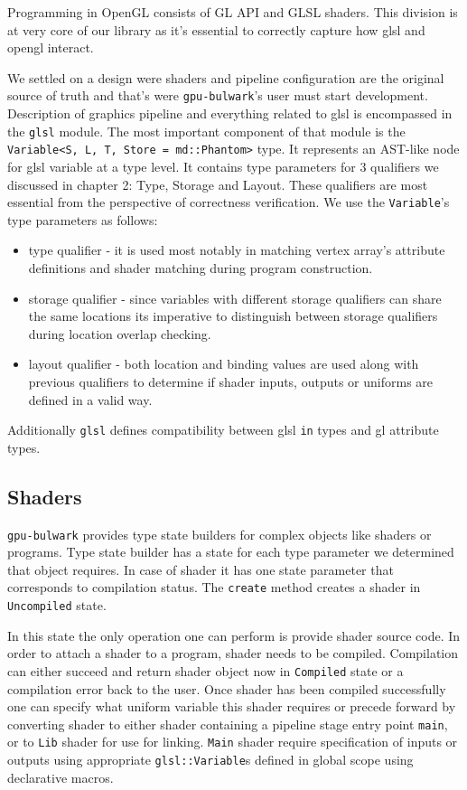 Programming in OpenGL consists of GL API and GLSL shaders. This division is at very core of our library as it's essential to correctly capture how glsl and opengl interact.

We settled on a design were shaders and pipeline configuration are the original source of truth and that's were \texttt{gpu-bulwark}'s user must start development.
Description of graphics pipeline and everything related to glsl is encompassed in the \texttt{glsl} module.
The most important component of that module is the \texttt{Variable<S, L, T, Store = md::Phantom>} type.
It represents an AST-like node for glsl variable at a type level.
It contains type parameters for 3 qualifiers we discussed in chapter 2: Type, Storage and Layout. These qualifiers are most essential from the perspective of correctness verification.
We use the \texttt{Variable}'s type parameters as follows:
\begin{itemize}
    \item type qualifier - it is used most notably in matching vertex array's attribute definitions and shader matching during program construction.
    \item storage qualifier - since variables with different storage qualifiers can share the same locations its imperative to distinguish between storage qualifiers during location overlap checking.
    \item layout qualifier - both location and binding values are used along with previous qualifiers to determine if shader inputs, outputs or uniforms are defined in a valid way.
\end{itemize}

Additionally \texttt{glsl} defines compatibility between glsl \texttt{in} types and gl attribute types.

\subsection{Shaders}

\texttt{gpu-bulwark} provides type state builders for complex objects like shaders or programs. Type state builder has a state for each type parameter we determined that object requires.
In case of shader it has one state parameter that corresponds to compilation status. The \texttt{create} method creates a shader in \texttt{Uncompiled} state.

In this state the only operation one can perform is provide shader source code. In order to attach a shader to a program, shader needs to be compiled. 
Compilation can either succeed and return shader object now in \texttt{Compiled} state or a compilation error back to the user.
Once shader has been compiled successfully one can specify what uniform variable this shader requires or precede forward by converting shader 
to either shader containing a pipeline stage entry point \texttt{main}, or to \texttt{Lib} shader for use for linking.
\texttt{Main} shader require specification of inputs or outputs using appropriate \texttt{glsl::Variable}s defined in global scope using declarative macros.

